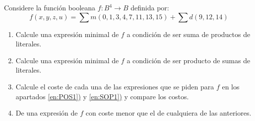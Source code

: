 \begin{exercise}
  Considere la función booleana $f\colon B^{4}\longrightarrow B$
  definida por:
  \begin{equation*}
    f(x,y,z,u)=\sum m(0,1,3,4,7,11,13,15)+\sum d(9,12,14)
  \end{equation*}
  \begin{enumerate}
  \item Calcule una expresión minimal de $f$ a condición de ser
    suma de productos de literales. \label{en:SOP1}
  \item Calcule una expresión minimal de $f$ a condición de ser
    producto de sumas de literales. \label{en:POS1}
  \item Calcule el coste de cada una de las expresiones que se piden
    para $f$ en los apartados \hyperref[en:POS1]{\ref*{en:POS1})} y
    \hyperref[en:SOP1]{\ref*{en:SOP1})} y compare los costos.
  \item De una expresión de $f$ con coste menor que el de cualquiera
    de las anteriores.
  \end{enumerate} %
\end{exercise}

